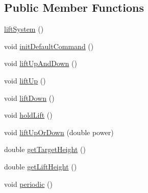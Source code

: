 \subsection*{Public Member Functions}
\begin{DoxyCompactItemize}
\item 
\mbox{\hyperlink{classorg_1_1usfirst_1_1frc3707_1_1_creedence_1_1subsystems_1_1lift_system_a8f2867003fb845f46c4e727c27cc664a}{lift\+System}} ()
\item 
void \mbox{\hyperlink{classorg_1_1usfirst_1_1frc3707_1_1_creedence_1_1subsystems_1_1lift_system_aabf6aa218075c4dc8855437fb48bd5a9}{init\+Default\+Command}} ()
\item 
void \mbox{\hyperlink{classorg_1_1usfirst_1_1frc3707_1_1_creedence_1_1subsystems_1_1lift_system_a2d90a37ee48a025f8df67abb1e175ba6}{lift\+Up\+And\+Down}} ()
\item 
void \mbox{\hyperlink{classorg_1_1usfirst_1_1frc3707_1_1_creedence_1_1subsystems_1_1lift_system_a3d85f01aeecfc160f8e9e85be4f82915}{lift\+Up}} ()
\item 
void \mbox{\hyperlink{classorg_1_1usfirst_1_1frc3707_1_1_creedence_1_1subsystems_1_1lift_system_a88d53bbd332c0be694214aeaeee5e237}{lift\+Down}} ()
\item 
void \mbox{\hyperlink{classorg_1_1usfirst_1_1frc3707_1_1_creedence_1_1subsystems_1_1lift_system_ad515efa130dc4606433c55954ca3f46d}{hold\+Lift}} ()
\item 
void \mbox{\hyperlink{classorg_1_1usfirst_1_1frc3707_1_1_creedence_1_1subsystems_1_1lift_system_a3280fa8a5a5df9f5f9f892a754e5bece}{lift\+Up\+Or\+Down}} (double power)
\item 
double \mbox{\hyperlink{classorg_1_1usfirst_1_1frc3707_1_1_creedence_1_1subsystems_1_1lift_system_aa8e633c4f1148b1b4d77e876d5d781b4}{get\+Target\+Height}} ()
\item 
double \mbox{\hyperlink{classorg_1_1usfirst_1_1frc3707_1_1_creedence_1_1subsystems_1_1lift_system_aabbda7f7ba1d5570aa899968b0d70ff7}{get\+Lift\+Height}} ()
\item 
void \mbox{\hyperlink{classorg_1_1usfirst_1_1frc3707_1_1_creedence_1_1subsystems_1_1lift_system_a9ddfb0eddd29188fda5a8852a20d7d5f}{periodic}} ()
\end{DoxyCompactItemize}

